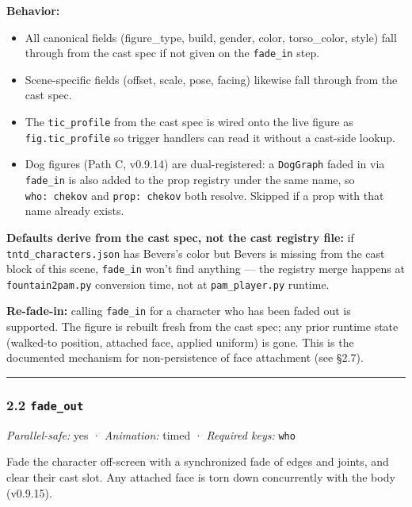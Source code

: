 \documentclass[
  11pt,
]{book}
\providecommand{\tightlist}{%
  \setlength{\itemsep}{0pt}\setlength{\parskip}{0pt}}
\begin{document}
\textbf{Behavior:}

\begin{itemize}
\tightlist
\item
  All canonical fields (figure\_type, build, gender, color,
  torso\_color, style) fall through from the cast spec if not given on
  the \texttt{fade\_in} step.
\item
  Scene-specific fields (offset, scale, pose, facing) likewise fall
  through from the cast spec.
\item
  The \texttt{tic\_profile} from the cast spec is wired onto the live
  figure as \texttt{fig.tic\_profile} so trigger handlers can read it
  without a cast-side lookup.
\item
  Dog figures (Path C, v0.9.14) are dual-registered: a \texttt{DogGraph}
  faded in via \texttt{fade\_in} is also added to the prop registry
  under the same name, so \texttt{who:\ chekov} and
  \texttt{prop:\ chekov} both resolve. Skipped if a prop with that name
  already exists.
\end{itemize}

\textbf{Defaults derive from the cast spec, not the cast registry file:}
if \texttt{tntd\_characters.json} has Bevers's color but Bevers is
missing from the cast block of this scene, \texttt{fade\_in} won't find
anything --- the registry merge happens at \texttt{fountain2pam.py}
conversion time, not at \texttt{pam\_player.py} runtime.

\textbf{Re-fade-in:} calling \texttt{fade\_in} for a character who has
been faded out is supported. The figure is rebuilt fresh from the cast
spec; any prior runtime state (walked-to position, attached face,
applied uniform) is gone. This is the documented mechanism for
non-persistence of face attachment (see §2.7).

\begin{center}\rule{0.5\linewidth}{0.5pt}\end{center}

\subsubsection{\texorpdfstring{2.2
\texttt{fade\_out}}{2.2 fade\_out}}\label{fade_out}

\emph{Parallel-safe:} yes · \emph{Animation:} timed · \emph{Required
keys:} \texttt{who}

Fade the character off-screen with a synchronized fade of edges and
joints, and clear their cast slot. Any attached face is torn down
concurrently with the body (v0.9.15).
\end{document}
